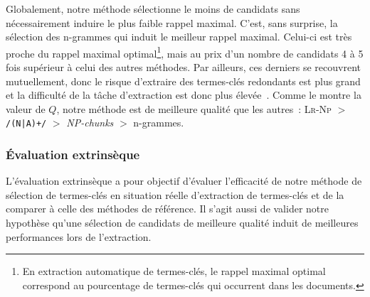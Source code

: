         Globalement, notre méthode sélectionne le moins de
        candidats sans nécessairement induire le plus faible rappel maximal.
        C'est, sans surprise, la sélection des n-grammes qui induit le meilleur
        rappel maximal. Celui-ci est très proche du rappel maximal
        optimal\footnote{En extraction automatique de termes-clés, le rappel
        maximal optimal correspond au pourcentage de termes-clés qui occurrent
        dans les documents.}, mais
        au prix d'un nombre de candidats 4 à 5 fois supérieur à celui des autres
        méthodes. Par ailleurs, ces derniers se recouvrent mutuellement, donc le
        risque d'extraire des termes-clés redondants est plus grand et la
        difficulté de la tâche d'extraction est donc plus
        élevée~\cite{hasan2014state_of_the_art}. Comme le montre la valeur de
        $Q$, notre méthode est de meilleure qualité que les autres~:
        \textsc{Lr-Np} $>$ \texttt{/(N|A)+/} $>$ \textit{NP-chunks} $>$
        n-grammes.

      \subsubsection{Évaluation extrinsèque}
      \label{subsubsec:main:domain_independent_keyphrase_extraction-keyphrase_candidate_selection-evaluation-extrinsic_evaluation}
        L'évaluation extrinsèque a pour objectif d'évaluer l'efficacité de notre
        méthode de sélection de termes-clés en situation réelle d'extraction de
        termes-clés et de la comparer à celle des méthodes de référence.
        Il s'agit aussi de valider notre hypothèse qu'une sélection de candidats
        de meilleure qualité induit de meilleures performances lors de
        l'extraction.

